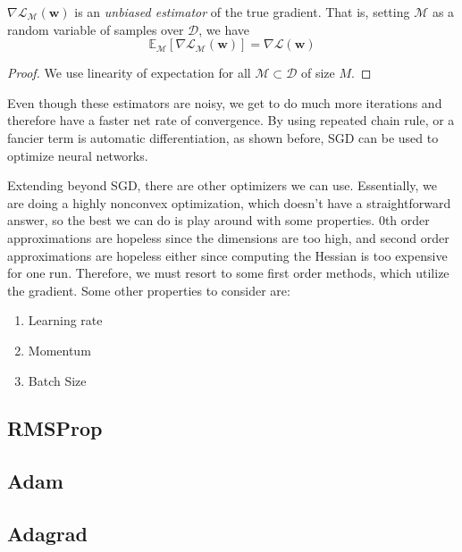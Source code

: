   \begin{theorem}
    $\nabla \mathcal{L}_{\mathcal{M}} (\mathbf{w})$ is an \textit{unbiased estimator} of the true gradient. That is, setting $\mathcal{M}$ as a random variable of samples over $\mathcal{D}$, we have 
    \begin{equation}
      \mathbb{E}_{\mathcal{M}} [\nabla \mathcal{L}_{\mathcal{M}} (\mathbf{w})] = \nabla \mathcal{L} (\mathbf{w})
    \end{equation}
  \end{theorem}
  \begin{proof}
    We use linearity of expectation for all $\mathcal{M} \subset \mathcal{D}$ of size $M$. 
  \end{proof}

  Even though these estimators are noisy, we get to do much more iterations and therefore have a faster net rate of convergence. By using repeated chain rule, or a fancier term is automatic differentiation, as shown before, SGD can be used to optimize neural networks. 

  Extending beyond SGD, there are other optimizers we can use. Essentially, we are doing a highly nonconvex optimization, which doesn't have a straightforward answer, so the best we can do is play around with some properties. 0th order approximations are hopeless since the dimensions are too high, and second order approximations are hopeless either since computing the Hessian is too expensive for one run. Therefore, we must resort to some first order methods, which utilize the gradient. Some other properties to consider are: 
  \begin{enumerate} 
    \item Learning rate 
    \item Momentum 
    \item Batch Size
  \end{enumerate}

\subsection{RMSProp} 

\subsection{Adam} 

\subsection{Adagrad}

